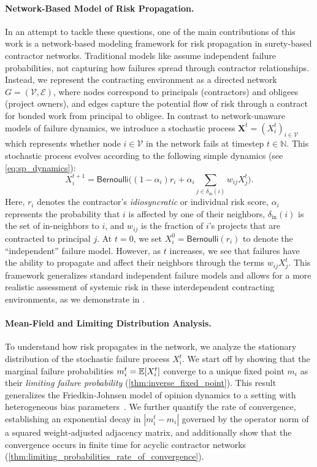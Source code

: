 \documentclass[mnsc,nonblindrev]{informs3}
\newcommand{\Exp}[1]{\mathbb E \left[ #1 \right]} %
\newcommand{\din}{\delta_{\text{in}}}
\newcommand{\Xvec}{\mathbf{X}}
\newcommand{\V}{\mathcal{V}}
\newcommand{\Ber}{\textsf{Bernoulli}}
\newcommand{\FJ}{Friedkin-Johnsen\xspace}
\newcommand{\E}{\mathcal{E}}
\let\originalleft\left
\let\originalright\right
\renewcommand{\left}{\mathopen{}\mathclose\bgroup\originalleft}
\renewcommand{\right}{\aftergroup\egroup\originalright}
\begin{document}
\paragraph{Network-Based Model of Risk Propagation.} In an attempt to tackle these questions, one of the main contributions of this work is a network-based modeling framework for risk propagation in surety-based contractor networks. Traditional models like \cite{kim2019default} assume independent failure probabilities, not capturing how failures spread through contractor relationships. Instead, we represent the contracting environment as a directed network $G = (\V, \E)$, where nodes correspond to principals (contractors) and obligees (project owners), and edges capture the potential flow of risk through a contract for bonded work from principal to obligee.  In contrast to network-unaware models of failure dynamics, we introduce a stochastic process $\Xvec^t = (X_i^t)_{i \in \V}$ which represents whether node $i \in \V$ in the network fails at timestep $t \in \mathbb{N}$.  This stochastic process evolves according to the following simple dynamics (see \cref{eq:sp_dynamics}):
\[
    X_i^{t+1} = \Ber\Big((1 - \alpha_i) r_i + \alpha_i \sum_{j \in \din(i)} w_{ij} X_j^{t}\Big).
\]
Here, $r_i$ denotes the contractor's {\em idiosyncratic} or individual risk score, $\alpha_i$ represents the probability that $i$ is affected by one of their neighbors, $\din(i)$ is the set of in-neighbors to $i$, and $w_{ij}$ is the fraction of $i$'s projects that are contracted to principal $j$.  At $t = 0$, we set $X_i^{0} = \Ber(r_i)$ to denote the ``independent'' failure model.  However, as $t$ increases, we see that failures have the ability to propagate and affect their neighbors through the terms $w_{ij}X_j^{t}$.
This framework generalizes standard independent failure models and allows for a more realistic assessment of systemic risk in these interdependent contracting environments, as we demonstrate in .

\paragraph{Mean-Field and Limiting Distribution Analysis.}
To understand how risk propagates in the network, we analyze the stationary distribution of the stochastic failure process $X_i^t$.  We start off by showing that the marginal failure probabilities $m_i^t = \Exp{X_i^t}$ converge to a unique fixed point $m_i$ as their {\em limiting failure probability} (\cref{thm:inverse_fixed_point}).  This result generalizes the \FJ model of opinion dynamics to a setting with heterogeneous bias parameters~\citep{FriedkinJohnsen}.  We further quantify the rate of convergence, establishing an exponential decay in $|m_i^t - m_i|$ governed by the operator norm of a squared weight-adjusted adjacency matrix, and additionally show that the convergence occurs in finite time for acyclic contractor networks (\cref{thm:limiting_probabilities_rate_of_convergence}).
\end{document}

